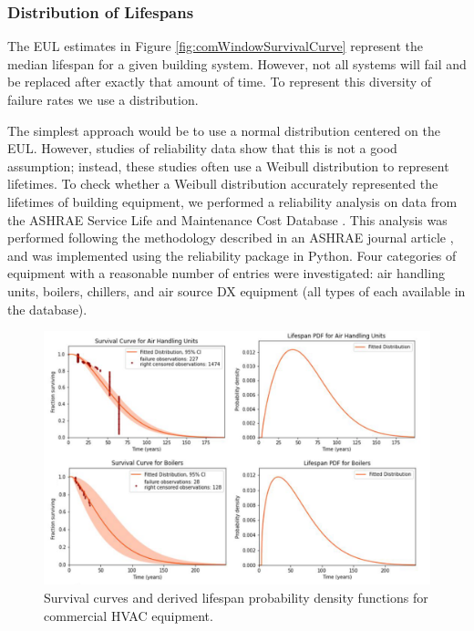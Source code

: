 \subsubsection{Distribution of Lifespans}
The EUL estimates in Figure \ref{fig:comWindowSurvivalCurve} represent the median lifespan for a given building system. However, not all systems will fail and be replaced after exactly that amount of time. To represent this diversity of failure rates we use a distribution.

\par
The simplest approach would be to use a normal distribution centered on the EUL. However, studies of reliability data show that this is not a good assumption; instead, these studies often use a Weibull distribution to represent lifetimes. To check whether a Weibull distribution accurately represented the lifetimes of building equipment, we performed a reliability analysis on data from the ASHRAE Service Life and Maintenance Cost Database \citep{ashrae_reliability_db}. This analysis was performed following the methodology described in an ASHRAE journal article \citep{determine_equip_life}, and was implemented using the reliability package \citep{matthew_reid_2020_3938000} in Python. Four categories of equipment with a reasonable number of entries were investigated: air handling units, boilers, chillers, and air source DX equipment (all types of each available in the database).

\begin{figure} [ht!]
\includegraphics[width=\textwidth]{figures/ashrae_equip_lifespans2.png}
\centering
\caption[Survival curves and derived lifespan probability density functions for HVAC equipment]{Survival curves and derived lifespan probability density functions for commercial HVAC equipment.}
\label{fig:hvac_survival_curves}
\end{figure}

